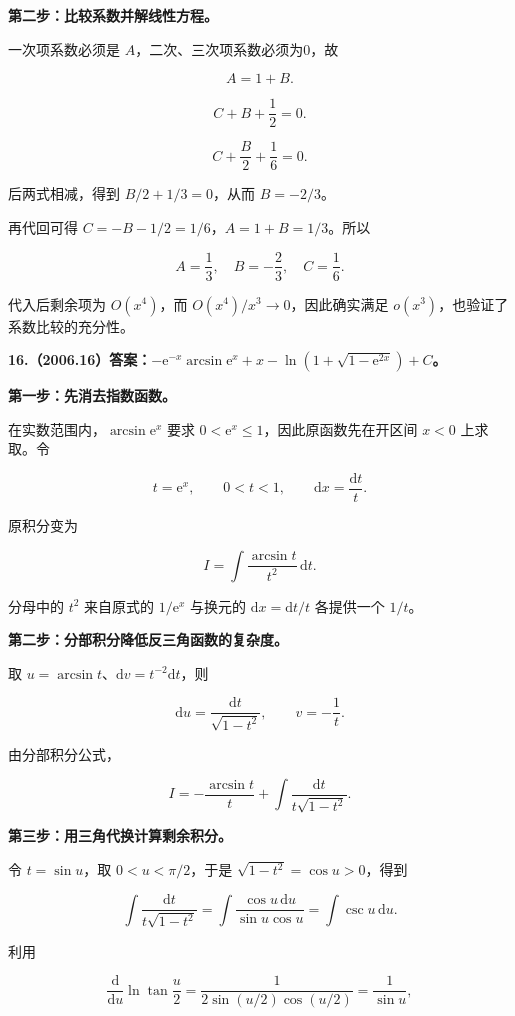 \documentclass[UTF8,11pt,fontset=windows]{ctexart}
\begin{document}
\textbf{第二步：比较系数并解线性方程。}

一次项系数必须是 $A$，二次、三次项系数必须为0，故

$$
A=1+B.
$$

$$
C+B+\frac12=0.
$$

$$
C+\frac B2+\frac16=0.
$$

后两式相减，得到 $B/2+1/3=0$，从而 $B=-2/3$。

再代回可得 $C=-B-1/2=1/6$，$A=1+B=1/3$。所以

$$
\boxed{A=\frac13,\quad B=-\frac23,\quad C=\frac16.}
$$

代入后剩余项为 $O(x^4)$，而 $O(x^4)/x^3\to0$，因此确实满足 $o(x^3)$，也验证了系数比较的充分性。

\clearpage

\textbf{16.（2006.16）答案：$-\mathrm e^{-x}\arcsin\mathrm e^x+x-\ln(1+\sqrt{1-\mathrm e^{2x}})+C$。}

\textbf{第一步：先消去指数函数。}

在实数范围内，$\arcsin\mathrm e^x$ 要求 $0<\mathrm e^x\le1$，因此原函数先在开区间 $x<0$ 上求取。令

$$
t=\mathrm e^x,\qquad0<t<1,\qquad\mathrm dx=\frac{\mathrm dt}{t}.
$$

原积分变为

$$
I=\int\frac{\arcsin t}{t^2}\,\mathrm dt.
$$

分母中的 $t^2$ 来自原式的 $1/\mathrm e^x$ 与换元的 $\mathrm dx=\mathrm dt/t$ 各提供一个 $1/t$。

\textbf{第二步：分部积分降低反三角函数的复杂度。}

取 $u=\arcsin t$、$\mathrm dv=t^{-2}\mathrm dt$，则

$$
\mathrm du=\frac{\mathrm dt}{\sqrt{1-t^2}},
\qquad v=-\frac1t.
$$

由分部积分公式，

$$
I=-\frac{\arcsin t}{t}
 +\int\frac{\mathrm dt}{t\sqrt{1-t^2}}.
$$

\textbf{第三步：用三角代换计算剩余积分。}

令 $t=\sin u$，取 $0<u<\pi/2$，于是 $\sqrt{1-t^2}=\cos u>0$，得到

$$
\int\frac{\mathrm dt}{t\sqrt{1-t^2}}
=\int\frac{\cos u\,\mathrm du}{\sin u\cos u}
=\int\csc u\,\mathrm du.
$$

利用

$$
\frac{\mathrm d}{\mathrm du}\ln\tan\frac u2
=\frac1{2\sin(u/2)\cos(u/2)}
=\frac1{\sin u},
$$
\end{document}
